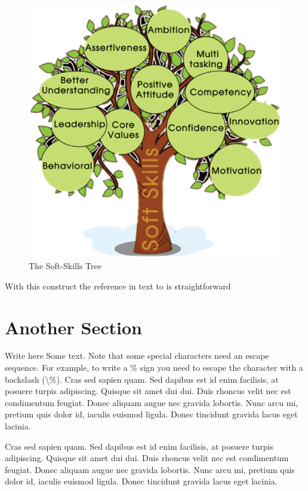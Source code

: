 \documentclass[a4paper,12pt,journal,twoside,compsoc]{PPIEEEtran}
\begin{document}
\begin{figure}[htbp]
\centering
\includegraphics[width=1\linewidth]{soft_skills.png}
\caption{The Soft-Skills Tree}
\label{fig_sim}
\end{figure}

With this construct the reference in text to  is straightforward
\section{Another Section}
\label{dummy}
Write here Some text. Note that some special characters need an escape sequence. For example, to write a \% sign you need to escape the character with a backslash (\textbackslash\%).
Cras sed sapien quam. Sed dapibus est id enim facilisis, at posuere turpis adipiscing. Quisque sit amet dui dui.
Duis rhoncus velit nec est condimentum feugiat. Donec aliquam augue nec gravida lobortis. Nunc arcu mi, pretium quis dolor id, iaculis euismod ligula. Donec tincidunt gravida lacus eget lacinia. 

Cras sed sapien quam. Sed dapibus est id enim facilisis, at posuere turpis adipiscing. Quisque sit amet dui dui.
Duis rhoncus velit nec est condimentum feugiat. Donec aliquam augue nec gravida lobortis. Nunc arcu mi, pretium quis dolor id, iaculis euismod ligula. Donec tincidunt gravida lacus eget lacinia. 
\end{document}
